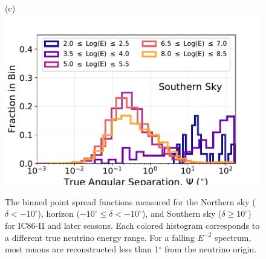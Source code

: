 \documentclass[aps,10pt,prd,twocolumn,floats,letterpaper,showpacs,nofootinbib,bibnotes,notitlepage,superscriptaddress,floatfix]{revtex4-1}
\begin{document}
\begin{figure}[t]
\begin{minipage}[c][3.5cm][c]{0.30\textwidth}
\end{minipage}
\begin{minipage}[c][3.5cm][c]{0.30\textwidth}\centering
{(c)}\\\includegraphics[width=\linewidth]{./PublicReleasePlots/ReconstructionPlots/IC86-II/IC86_II_MC_psf_0.pdf}
\end{minipage}
\caption{The binned point spread functions measured for the Northern sky ($\delta<-10^\circ$), horizon ($-10^\circ\leq\delta<-10^\circ$), and Southern sky ($\delta\geq 10^\circ$) for IC86-II and later seasons. Each colored histogram corresponds to a different true neutrino energy range. For a falling $E^{-2}$ spectrum, most muons are reconstructed less than 1$^\circ$ from the neutrino origin.}\label{fig:PSF}
\end{figure}
\end{document}
